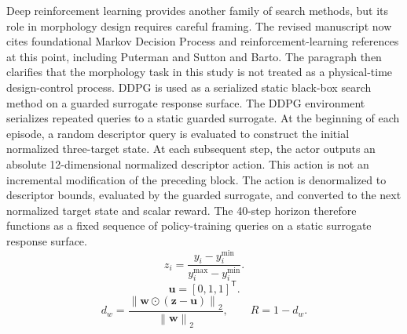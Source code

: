 \documentclass[10pt]{article}
\newcommand{\RewardEquations}{%
\[
z_i =
\frac{y_i-y_i^{\min}}
{y_i^{\max}-y_i^{\min}} .
\]
\[
\mathbf{u} = [0,1,1]^\mathsf{T}.
\]
\[
d_w =
\frac{\left\|\mathbf{w}\odot(\mathbf{z}-\mathbf{u})\right\|_2}
{\left\|\mathbf{w}\right\|_2},
\qquad
R = 1-d_w .
\]
}
\begin{document}
\begin{revisionbox}
Deep reinforcement learning provides another family of search methods, but its role in morphology design requires careful framing. The revised manuscript now cites foundational Markov Decision Process and reinforcement-learning references at this point, including Puterman and Sutton and Barto. The paragraph then clarifies that the morphology task in this study is not treated as a physical-time design-control process. DDPG is used as a serialized static black-box search method on a guarded surrogate response surface.
\revisionseparator
{}
The DDPG environment serializes repeated queries to a static guarded surrogate. At the beginning of each episode, a random descriptor query is evaluated to construct the initial normalized three-target state. At each subsequent step, the actor outputs an absolute 12-dimensional normalized descriptor action. This action is not an incremental modification of the preceding block. The action is denormalized to descriptor bounds, evaluated by the guarded surrogate, and converted to the next normalized target state and scalar reward. The 40-step horizon therefore functions as a fixed sequence of policy-training queries on a static surrogate response surface.
\revisionseparator
{}
\RewardEquations
\end{revisionbox}
\begin{responsereferences}
\end{responsereferences}
\end{document}
